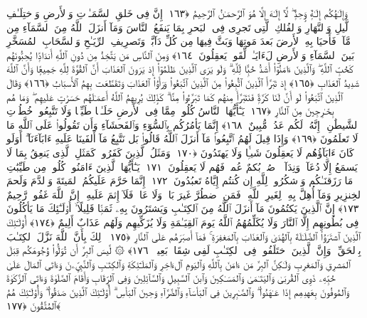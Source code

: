  وَإِلَـٰهُكُم إِلَـٰهٌۭ وَٟحِدٌۭ ۖ لَّآ إِلَـٰهَ إِلَّا هُوَ ٱلرَّحمَـٰنُ ٱلرَّحِيمُ ﴿١٦٣﴾
 إِنَّ فِى خَلقِ ٱلسَّمَـٰوَٟتِ وَٱلأَرضِ وَٱختِلَـٰفِ ٱلَّيلِ وَٱلنَّهَارِ وَٱلفُلكِ ٱلَّتِى تَجرِى فِى ٱلبَحرِ بِمَا يَنفَعُ ٱلنَّاسَ وَمَآ أَنزَلَ ٱللَّهُ مِنَ ٱلسَّمَآءِ مِن مَّآءٍۢ فَأَحيَا بِهِ ٱلأَرضَ بَعدَ مَوتِهَا وَبَثَّ فِيهَا مِن كُلِّ دَآبَّةٍۢ وَتَصرِيفِ ٱلرِّيَـٰحِ وَٱلسَّحَابِ ٱلمُسَخَّرِ بَينَ ٱلسَّمَآءِ وَٱلأَرضِ لَءَايَـٰتٍۢ لِّقَومٍۢ يَعقِلُونَ ﴿١٦٤﴾
 وَمِنَ ٱلنَّاسِ مَن يَتَّخِذُ مِن دُونِ ٱللَّهِ أَندَادًۭا يُحِبُّونَهُم كَحُبِّ ٱللَّهِ ۖ وَٱلَّذِينَ ءَامَنُوٓا۟ أَشَدُّ حُبًّۭا لِّلَّهِ ۗ وَلَو يَرَى ٱلَّذِينَ ظَلَمُوٓا۟ إِذ يَرَونَ ٱلعَذَابَ أَنَّ ٱلقُوَّةَ لِلَّهِ جَمِيعًۭا وَأَنَّ ٱللَّهَ شَدِيدُ ٱلعَذَابِ ﴿١٦٥﴾
 إِذ تَبَرَّأَ ٱلَّذِينَ ٱتُّبِعُوا۟ مِنَ ٱلَّذِينَ ٱتَّبَعُوا۟ وَرَأَوُا۟ ٱلعَذَابَ وَتَقَطَّعَت بِهِمُ ٱلأَسبَابُ ﴿١٦٦﴾
 وَقَالَ ٱلَّذِينَ ٱتَّبَعُوا۟ لَو أَنَّ لَنَا كَرَّةًۭ فَنَتَبَرَّأَ مِنهُم كَمَا تَبَرَّءُوا۟ مِنَّا ۗ كَذَٟلِكَ يُرِيهِمُ ٱللَّهُ أَعمَـٰلَهُم حَسَرَٰتٍ عَلَيهِم ۖ وَمَا هُم بِخَـٰرِجِينَ مِنَ ٱلنَّارِ ﴿١٦٧﴾
 يَـٰٓأَيُّهَا ٱلنَّاسُ كُلُوا۟ مِمَّا فِى ٱلأَرضِ حَلَـٰلًۭا طَيِّبًۭا وَلَا تَتَّبِعُوا۟ خُطُوَٟتِ ٱلشَّيطَٰنِ ۚ إِنَّهُۥ لَكُم عَدُوٌّۭ مُّبِينٌ ﴿١٦٨﴾
 إِنَّمَا يَأمُرُكُم بِٱلسُّوٓءِ وَٱلفَحشَآءِ وَأَن تَقُولُوا۟ عَلَى ٱللَّهِ مَا لَا تَعلَمُونَ ﴿١٦٩﴾
 وَإِذَا قِيلَ لَهُمُ ٱتَّبِعُوا۟ مَآ أَنزَلَ ٱللَّهُ قَالُوا۟ بَل نَتَّبِعُ مَآ أَلفَينَا عَلَيهِ ءَابَآءَنَآ ۗ أَوَلَو كَانَ ءَابَآؤُهُم لَا يَعقِلُونَ شَيـًۭٔا وَلَا يَهتَدُونَ ﴿١٧٠﴾
 وَمَثَلُ ٱلَّذِينَ كَفَرُوا۟ كَمَثَلِ ٱلَّذِى يَنعِقُ بِمَا لَا يَسمَعُ إِلَّا دُعَآءًۭ وَنِدَآءًۭ ۚ صُمٌّۢ بُكمٌ عُمىٌۭ فَهُم لَا يَعقِلُونَ ﴿١٧١﴾
 يَـٰٓأَيُّهَا ٱلَّذِينَ ءَامَنُوا۟ كُلُوا۟ مِن طَيِّبَٰتِ مَا رَزَقنَـٰكُم وَٱشكُرُوا۟ لِلَّهِ إِن كُنتُم إِيَّاهُ تَعبُدُونَ ﴿١٧٢﴾
 إِنَّمَا حَرَّمَ عَلَيكُمُ ٱلمَيتَةَ وَٱلدَّمَ وَلَحمَ ٱلخِنزِيرِ وَمَآ أُهِلَّ بِهِۦ لِغَيرِ ٱللَّهِ ۖ فَمَنِ ٱضطُرَّ غَيرَ بَاغٍۢ وَلَا عَادٍۢ فَلَآ إِثمَ عَلَيهِ ۚ إِنَّ ٱللَّهَ غَفُورٌۭ رَّحِيمٌ ﴿١٧٣﴾
 إِنَّ ٱلَّذِينَ يَكتُمُونَ مَآ أَنزَلَ ٱللَّهُ مِنَ ٱلكِتَـٰبِ وَيَشتَرُونَ بِهِۦ ثَمَنًۭا قَلِيلًا ۙ أُو۟لَـٰٓئِكَ مَا يَأكُلُونَ فِى بُطُونِهِم إِلَّا ٱلنَّارَ وَلَا يُكَلِّمُهُمُ ٱللَّهُ يَومَ ٱلقِيَـٰمَةِ وَلَا يُزَكِّيهِم وَلَهُم عَذَابٌ أَلِيمٌ ﴿١٧٤﴾
 أُو۟لَـٰٓئِكَ ٱلَّذِينَ ٱشتَرَوُا۟ ٱلضَّلَـٰلَةَ بِٱلهُدَىٰ وَٱلعَذَابَ بِٱلمَغفِرَةِ ۚ فَمَآ أَصبَرَهُم عَلَى ٱلنَّارِ ﴿١٧٥﴾
 ذَٟلِكَ بِأَنَّ ٱللَّهَ نَزَّلَ ٱلكِتَـٰبَ بِٱلحَقِّ ۗ وَإِنَّ ٱلَّذِينَ ٱختَلَفُوا۟ فِى ٱلكِتَـٰبِ لَفِى شِقَاقٍۭ بَعِيدٍۢ ﴿١٧٦﴾
 ۞ لَّيسَ ٱلبِرَّ أَن تُوَلُّوا۟ وُجُوهَكُم قِبَلَ ٱلمَشرِقِ وَٱلمَغرِبِ وَلَـٰكِنَّ ٱلبِرَّ مَن ءَامَنَ بِٱللَّهِ وَٱليَومِ ٱلءَاخِرِ وَٱلمَلَـٰٓئِكَةِ وَٱلكِتَـٰبِ وَٱلنَّبِيِّۦنَ وَءَاتَى ٱلمَالَ عَلَىٰ حُبِّهِۦ ذَوِى ٱلقُربَىٰ وَٱليَتَـٰمَىٰ وَٱلمَسَـٰكِينَ وَٱبنَ ٱلسَّبِيلِ وَٱلسَّآئِلِينَ وَفِى ٱلرِّقَابِ وَأَقَامَ ٱلصَّلَوٰةَ وَءَاتَى ٱلزَّكَوٰةَ وَٱلمُوفُونَ بِعَهدِهِم إِذَا عَـٰهَدُوا۟ ۖ وَٱلصَّـٰبِرِينَ فِى ٱلبَأسَآءِ وَٱلضَّرَّآءِ وَحِينَ ٱلبَأسِ ۗ أُو۟لَـٰٓئِكَ ٱلَّذِينَ صَدَقُوا۟ ۖ وَأُو۟لَـٰٓئِكَ هُمُ ٱلمُتَّقُونَ ﴿١٧٧﴾
